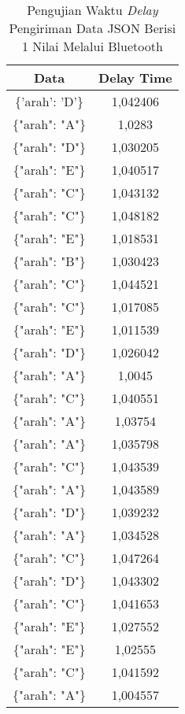 \begin{table}[!ht]
  \centering
  \caption{Pengujian Waktu \emph{Delay} Pengiriman Data JSON Berisi 1 Nilai Melalui Bluetooth}
  \label{tbl:delayBluetoothJSON1}
  \begin{tabular}{|c|c|}
  \hline
  Data               & Delay Time  \\ \hline
  \{'arah': 'D'\}    & 1,042406    \\ \hline
  \{"arah": "A"\}    & 1,0283      \\ \hline
  \{"arah": "D"\}    & 1,030205    \\ \hline
  \{"arah": "E"\}    & 1,040517    \\ \hline
  \{"arah": "C"\}    & 1,043132    \\ \hline
  \{"arah": "C"\}    & 1,048182    \\ \hline
  \{"arah": "E"\}    & 1,018531    \\ \hline
  \{"arah": "B"\}    & 1,030423    \\ \hline
  \{"arah": "C"\}    & 1,044521    \\ \hline
  \{"arah": "C"\}    & 1,017085    \\ \hline
  \{"arah": "E"\}    & 1,011539    \\ \hline
  \{"arah": "D"\}    & 1,026042    \\ \hline
  \{"arah": "A"\}    & 1,0045      \\ \hline
  \{"arah": "C"\}    & 1,040551    \\ \hline
  \{"arah": "A"\}    & 1,03754     \\ \hline
  \{"arah": "A"\}    & 1,035798    \\ \hline
  \{"arah": "C"\}    & 1,043539    \\ \hline
  \{"arah": "A"\}    & 1,043589    \\ \hline
  \{"arah": "D"\}    & 1,039232    \\ \hline
  \{"arah": "A"\}    & 1,034528    \\ \hline
  \{"arah": "C"\}    & 1,047264    \\ \hline
  \{"arah": "D"\}    & 1,043302    \\ \hline
  \{"arah": "C"\}    & 1,041653    \\ \hline
  \{"arah": "E"\}    & 1,027552    \\ \hline
  \{"arah": "E"\}    & 1,02555     \\ \hline
  \{"arah": "C"\}    & 1,041592    \\ \hline
  \{"arah": "A"\}    & 1,004557    \\ \hline

\end{tabular}
\end{table}
